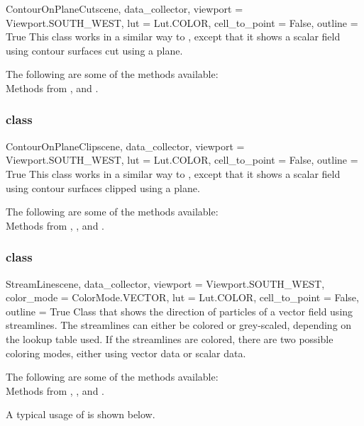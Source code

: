 \begin{classdesc}{ContourOnPlaneCut}{scene, data_collector,
viewport = Viewport.SOUTH_WEST, lut = Lut.COLOR, cell_to_point = False, 
outline = True}
This class works in a similar way to \MapOnPlaneCut, except that it shows a
scalar field using contour surfaces cut using a plane.
\end{classdesc}

The following are some of the methods available:\\
Methods from \ActorThreeD, \ContourModule and \Transform. 

\subsubsection{\ContourOnPlaneClip class}

\begin{classdesc}{ContourOnPlaneClip}{scene, data_collector, 
viewport = Viewport.SOUTH_WEST, lut = Lut.COLOR, cell_to_point = False, 
outline = True}
This class works in a similar way to \MapOnPlaneClip, except that it shows a 
scalar field using contour surfaces clipped using a plane.
\end{classdesc}

The following are some of the methods available:\\
Methods from \ActorThreeD, \ContourModule, \Transform and \Clipper. 

\subsubsection{\StreamLine class}

\begin{classdesc}{StreamLine}{scene, data_collector,
viewport = Viewport.SOUTH_WEST, color_mode = ColorMode.VECTOR, lut = Lut.COLOR,
cell_to_point = False, outline = True}
Class that shows the direction of particles of a vector field using streamlines.
The streamlines can either be colored or grey-scaled, depending on the lookup
table used. If the streamlines are colored, there are two possible coloring 
modes, either using vector data or scalar data.
\end{classdesc}

The following are some of the methods available:\\
Methods from \ActorThreeD, \PointSource, \StreamLineModule and \Tube. 

A typical usage of \StreamLine is shown below.

